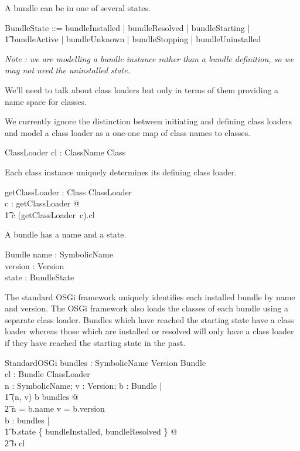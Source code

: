 \documentclass[a4paper]{article}
\begin{document}
A bundle can be in one of several states.
\begin{zed}
  BundleState ::= bundleInstalled | bundleResolved | bundleStarting | \\ 
\t1 bundleActive | bundleUnknown | bundleStopping | bundleUninstalled 
\end{zed}
\textit{Note : we are modelling a bundle instance rather than
a bundle definition, so we may not need the uninstalled state.}

We'll need to talk about class loaders but only in terms of them providing a name space for classes.
\begin{zed}
\end{zed}

We currently ignore the distinction between initiating and defining class loaders and model a class
loader as a one-one map of class names to classes.
\begin{schema}{ClassLoader}
 cl : ClassName \pinj Class \\
\end{schema}

Each class instance uniquely determines its defining class loader.
\begin{axdef}
  getClassLoader : Class \pfun ClassLoader \\
\where
  \forall c : \dom getClassLoader @ \\
\t1 c \in \ran (getClassLoader~c).cl \\
\end{axdef}

A bundle has a name and a state.
\begin{schema}{Bundle}
 name : SymbolicName \\
 version : Version \\
 state : BundleState \\
\end{schema}

The standard OSGi framework uniquely identifies each installed bundle by name and version.
The OSGi framework also loads the classes of each bundle using a separate class loader.
Bundles which have reached the starting state have a class loader whereas those which are
installed or resolved will only have a class loader if they have reached the starting state in
the past.
\begin{schema}{StandardOSGi}
 bundles : SymbolicName \cross Version \pinj Bundle \\
 cl : Bundle \pinj ClassLoader \\
\where
 \forall n : SymbolicName; v : Version; b : Bundle | \\
\t1 (n, v) \mapsto b \in bundles @ \\
\t2 n = b.name \land v = b.version \\
 \forall b : \ran bundles | \\
\t1 b.state \notin \{ bundleInstalled, bundleResolved \} @ \\
\t2 b \in \dom cl \\
\end{schema}
\end{document}
